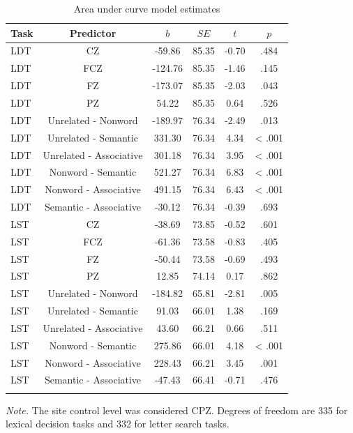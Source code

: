 \documentclass[english,man]{apa6}
\theoremstyle{definition}
\theoremstyle{definition}
\theoremstyle{definition}
\theoremstyle{remark}
\begin{document}
\begin{table}[tbp]
\begin{center}
\begin{threeparttable}
\caption{\label{tab:area-table-est}Area under curve model estimates}
\begin{tabular}{lccccc}
\toprule
Task & Predictor & $b$ & $SE$ & $t$ & $p$\\
\midrule
LDT & CZ & -59.86 & 85.35 & -0.70 & .484\\
LDT & FCZ & -124.76 & 85.35 & -1.46 & .145\\
LDT & FZ & -173.07 & 85.35 & -2.03 & .043\\
LDT & PZ & 54.22 & 85.35 & 0.64 & .526\\
LDT & Unrelated - Nonword & -189.97 & 76.34 & -2.49 & .013\\
LDT & Unrelated - Semantic & 331.30 & 76.34 & 4.34 & < .001\\
LDT & Unrelated - Associative & 301.18 & 76.34 & 3.95 & < .001\\
LDT & Nonword - Semantic & 521.27 & 76.34 & 6.83 & < .001\\
LDT & Nonword - Associative & 491.15 & 76.34 & 6.43 & < .001\\
LDT & Semantic - Associative & -30.12 & 76.34 & -0.39 & .693\\
LST & CZ & -38.69 & 73.85 & -0.52 & .601\\
LST & FCZ & -61.36 & 73.58 & -0.83 & .405\\
LST & FZ & -50.44 & 73.58 & -0.69 & .493\\
LST & PZ & 12.85 & 74.14 & 0.17 & .862\\
LST & Unrelated - Nonword & -184.82 & 65.81 & -2.81 & .005\\
LST & Unrelated - Semantic & 91.03 & 66.01 & 1.38 & .169\\
LST & Unrelated - Associative & 43.60 & 66.21 & 0.66 & .511\\
LST & Nonword - Semantic & 275.86 & 66.01 & 4.18 & < .001\\
LST & Nonword - Associative & 228.43 & 66.21 & 3.45 & .001\\
LST & Semantic - Associative & -47.43 & 66.41 & -0.71 & .476\\
\bottomrule
\addlinespace
\end{tabular}
\begin{tablenotes}[para]
\textit{Note.} The site control level was considered CPZ. Degrees of freedom are 335 for lexical decision tasks and 332 for letter search tasks.
\end{tablenotes}
\end{threeparttable}
\end{center}
\end{table}
\end{document}
